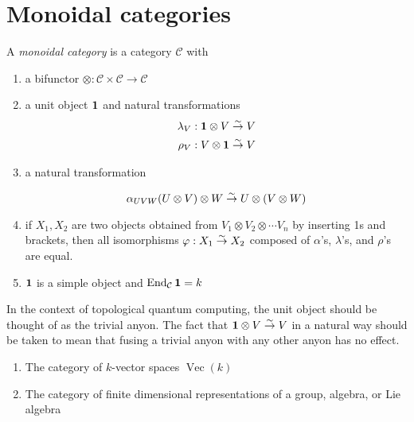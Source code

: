 \section{Monoidal categories}
\begin{defn}
    A \emph{monoidal category} is a category $\mathcal{C}$ with 
    \begin{enumerate}
    \renewcommand{\labelenumi}{\roman{enumi})}
        \item a bifunctor $\otimes: \mathcal{C} \times \mathcal{C} \to
            \mathcal{C}$
        \item a unit object $\mathbf{1}$ and natural transformations
            \begin{align}
                \lambda_V &: \mathbf{1} \otimes V \overset{\sim}{\rightarrow} V \\
                \rho_V &: V \otimes \mathbf{1} \overset{\sim}{\rightarrow} V
            \end{align}
        \item a natural transformation 

            \begin{equation}
                \alpha_{UVW} (U \otimes V) \otimes W \overset{\sim}{\rightarrow} U \otimes (V \otimes W)
            \end{equation}

        \item if $X_1, X_2$ are two objects obtained from $V_1 \otimes V_2
            \otimes \cdots V_n$ by inserting 1s and brackets, then all
            isomorphisms $\varphi: X_1 \overset{\sim}{\rightarrow} X_2$ composed of $\alpha$'s,
            $\lambda$'s, and $\rho$'s are equal. 
        \item $\mathbf{1}$ is a simple object and $\operatorname{End}_\mathcal{C} \mathbf{1} = k$
    \end{enumerate}

\end{defn}

In the context of topological quantum computing, the unit object should be
thought of as the trivial anyon. The fact that $\mathbf{1} \otimes V \overset{\sim}{\rightarrow} V$
in a natural way should be taken to mean that fusing a trivial anyon with any
other anyon has no effect.

\begin{example}
    \begin{enumerate}
    \renewcommand{\labelenumi}{\roman{enumi})}
        \item The category of $k$-vector spaces $\operatorname{Vec}(k)$
        \item The category of finite dimensional representations of a group, algebra, or Lie algebra
    \end{enumerate}
\end{example}

